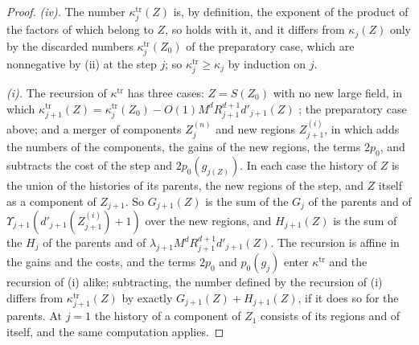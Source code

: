 \documentclass[11pt]{preprint}
\numberwithin{equation}{section}
\theoremstyle{definition}
\theoremstyle{remark}
\theoremstyle{plain}
\begin{document}
\begin{proof}
\emph{(iv).} The number $\kappa^{\mathrm{tr}}_j(Z)$ is, by definition, the exponent of the product of the factors of \cite[(1.79)]{BalabanLFR2} which belong to $Z$, so \cite[(1.79)]{BalabanLFR2} holds with it, and it differs from $\kappa_j(Z)$ only by the discarded numbers $\kappa^{\mathrm{tr}}_j(Z_0)$ of the preparatory case, which are nonnegative by (ii) at the step $j$; so $\kappa^{\mathrm{tr}}_j \geq \kappa_j$ by induction on $j$.

\emph{(i).} The recursion of $\kappa^{\mathrm{tr}}$ has three cases: $Z = S(Z_0)$ with no new large field, in which $\kappa^{\mathrm{tr}}_{j+1}(Z) = \kappa^{\mathrm{tr}}_j(Z_0) - O(1)M^dR_{j+1}^{d+1}d'_{j+1}(Z)$ \cite[(1.83)]{BalabanLFR2}; the preparatory case above; and a merger of components $Z^{(n)}_j$ and new regions $Z^{(i)}_{j+1}$, in which \cite[(1.85)]{BalabanLFR2} adds the numbers of the components, the gains of the new regions, the terms $2p_0$, and subtracts the cost of the step and $2p_0(g_{j(Z)})$. In each case the history of $Z$ is the union of the histories of its parents, the new regions of the step, and $Z$ itself as a component of $Z_{j+1}$. So $G_{j+1}(Z)$ is the sum of the $G_j$ of the parents and of $\Upsilon_{j+1}(d'_{j+1}(Z^{(i)}_{j+1}) + 1)$ over the new regions, and $H_{j+1}(Z)$ is the sum of the $H_j$ of the parents and of $\lambda_{j+1}M^dR_{j+1}^{d+1}d'_{j+1}(Z)$. The recursion is affine in the gains and the costs, and the terms $2p_0$ and $p_0(g_j)$ enter $\kappa^{\mathrm{tr}}$ and the recursion of (i) alike; subtracting, the number defined by the recursion of (i) differs from $\kappa^{\mathrm{tr}}_{j+1}(Z)$ by exactly $G_{j+1}(Z) + H_{j+1}(Z)$, if it does so for the parents. At $j = 1$ the history of a component of $Z_1$ consists of its regions and of itself, and the same computation applies.


\end{proof}
\end{document}
